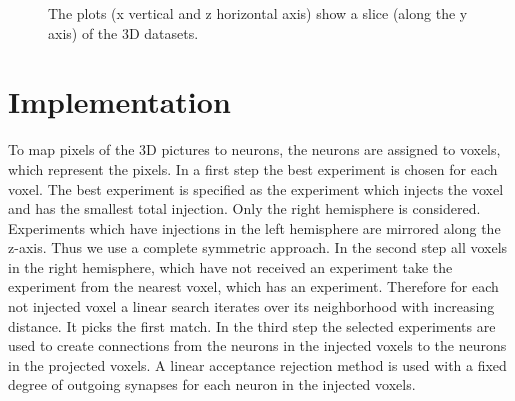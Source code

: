 \documentclass[a4paper]{article}
\begin{document}
   \begin{figure}[ht!]
   	\begin{center}
    	   \end{center}
    	\caption{%
        The plots (x vertical and z horizontal axis) show a slice (along the y axis) of the 3D datasets. 
     }%
   \label{fig:atlas}
   \end{figure}
   \newpage
	\section{Implementation}
	To map pixels of the 3D pictures to neurons, the neurons are assigned to voxels, which represent the pixels.
	In a first step the best experiment is chosen for each voxel. The best experiment is specified as the experiment which
	injects the voxel and has the smallest total injection.
	Only the right hemisphere is considered. Experiments which have injections
	in the left hemisphere are mirrored along the z-axis. Thus we use a complete symmetric approach.
	In the second step all voxels in the right hemisphere, which have not received an experiment take the experiment
	from the nearest voxel, which has an experiment. Therefore for each not injected voxel a linear search iterates over its neighborhood
	with increasing distance. It picks the first match.
	In the third step the selected experiments are used to create connections from the neurons in the injected voxels to the neurons in the 
	projected voxels. A linear acceptance rejection method is used with a fixed degree of outgoing synapses for each neuron in the injected voxels.
	
\end{document}
